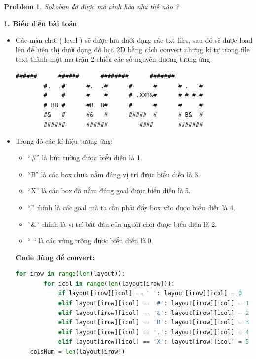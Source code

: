 \documentclass[12pt]{article}
\newtheorem{problem}{Problem}
\begin{document}
\begin{problem}
	Sokoban đã được mô hình hóa như thế nào ?
\end{problem}
\hspace{-1em}\textbf{1. Biểu diễn bài toán} 
\begin{itemize}
	\lstset{style=mystyle}

	\item Các màn chơi ( level ) sẽ được lưu dưới dạng các txt files, sau đó sẽ được load lên để hiện thị dưới dạng đồ họa 2D bằng cách convert những kí tự trong file text thành một ma trận 2 chiều các số nguyên dương tương ứng.
	
	\begin{tcolorbox}[boxrule=0.5pt, colback=white]
		\begin{lstlisting}[numbers=none, basicstyle=\ttfamily]
		######      ######      ########      #######
		#.  .#      #.  .#      #      #      # .   #
		#    #      #    #      # .XXB&#      # # # #
		# BB #      #B  B#      #      #      #     #
		#&   #      #&   #      #####  #      # B&  #
		######      ######         ####       #######
		\end{lstlisting} 
	\end{tcolorbox}
	
	\lstset{style=mystyle}

	\item Trong đó các kí hiệu tương ứng:
	\begin{itemize}
		\item “\#” là bức tường được biểu diễn là 1.
		\item “B” là các box chưa nằm đúng vị trí được biểu diễn là 3.
		\item “X” là các box đã nằm đúng goal được biểu diễn là 5.
		\item “.” chính là các goal mà ta cần phải đẩy box vào được biểu
		diễn là 4.
		\item “\&” chính là vị trí bắt đầu của người chơi được biểu diễn là 2.
		\item “ “  là các vùng trống được biểu diễn là 0
	\end{itemize}
	\noindent \hspace*{-1em}\textbf{
  Code dùng để convert:}
\begin{tcolorbox}[boxrule=0.5pt, colback=white]
\begin{lstlisting}[language=python, numbers=none, basicstyle=\ttfamily\footnotesize]
	for irow in range(len(layout)):
		for icol in range(len(layout[irow])):
			if layout[irow][icol] == ' ': layout[irow][icol] = 0   
			elif layout[irow][icol] == '#': layout[irow][icol] = 1 
			elif layout[irow][icol] == '&': layout[irow][icol] = 2 
			elif layout[irow][icol] == 'B': layout[irow][icol] = 3 
			elif layout[irow][icol] == '.': layout[irow][icol] = 4 
			elif layout[irow][icol] == 'X': layout[irow][icol] = 5 
	colsNum = len(layout[irow])
\end{lstlisting}
\end{tcolorbox}
\end{itemize}
\end{document}
